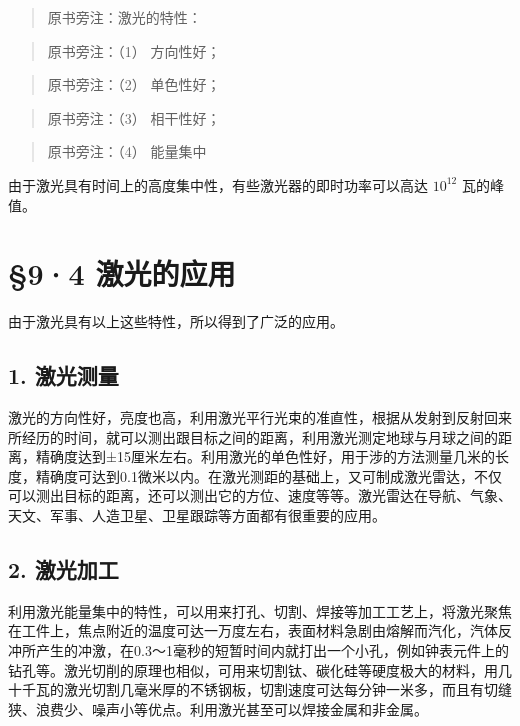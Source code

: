 \begin{quote}
原书旁注：激光的特性：
\end{quote}

\begin{quote}
原书旁注：（1） 方向性好；
\end{quote}

\begin{quote}
原书旁注：（2） 单色性好；
\end{quote}

\begin{quote}
原书旁注：（3） 相干性好；
\end{quote}

\begin{quote}
原书旁注：（4） 能量集中
\end{quote}

由于激光具有时间上的高度集中性，有些激光器的即时功率可以高达 \(10^{12}\)
瓦的峰值。

\section{§9·4 激光的应用}

由于激光具有以上这些特性，所以得到了广泛的应用。

\subsection{1. 激光测量}

激光的方向性好，亮度也高，利用激光平行光束的准直性，根据从发射到反射回来所经历的时间，就可以测出跟目标之间的距离，利用激光测定地球与月球之间的距离，精确度达到±15厘米左右。利用激光的单色性好，用于涉的方法测量几米的长度，精确度可达到0.1微米以内。在激光测距的基础上，又可制成激光雷达，不仅可以测出目标的距离，还可以测出它的方位、速度等等。激光雷达在导航、气象、天文、军事、人造卫星、卫星跟踪等方面都有很重要的应用。

\subsection{2. 激光加工}

利用激光能量集中的特性，可以用来打孔、切割、焊接等加工工艺上，将激光聚焦在工件上，焦点附近的温度可达一万度左右，表面材料急剧由熔解而汽化，汽体反冲所产生的冲激，在0.3～1毫秒的短暂时间内就打出一个小孔，例如钟表元件上的钻孔等。激光切削的原理也相似，可用来切割钛、碳化硅等硬度极大的材料，用几十千瓦的激光切割几毫米厚的不锈钢板，切割速度可达每分钟一米多，而且有切缝狭、浪费少、噪声小等优点。利用激光甚至可以焊接金属和非金属。

